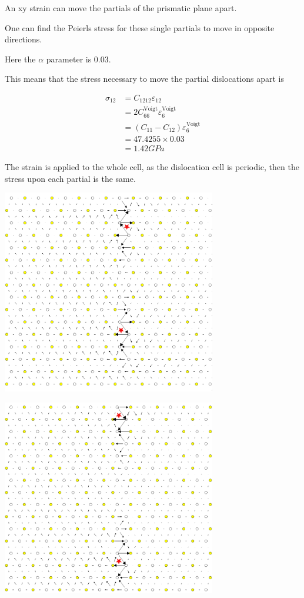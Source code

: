 \documentclass[11pt]{article}
\begin{document}
An xy strain can move the partials of the prismatic plane apart. 

One can find the Peierls stress for these single partials to move
in opposite directions.

Here the \(\alpha\) parameter is 0.03. 

This means that the stress necessary to move the partial
dislocations apart is 

\begin{align*}
\sigma_{12} &= C_{1212}\varepsilon_{12} \\
    &= 2C^{\text{Voigt}}_{66 }\varepsilon_6^{\text{Voigt}} \\
    &= ( C_{11}- C_{12}) \varepsilon_6^{\text{Voigt}} \\
    &= 47.4255 \times 0.03 \\ 
    &= 1.42 GPa\ 
\end{align*}

The strain is applied to the whole cell, as the dislocation cell
is periodic, then the stress upon each partial is the same. 

\begin{center}
\includegraphics[width=0.7\textwidth]{Images/final_model_peierls_xy_0.03_initial_partials.png}
\end{center}
\begin{center}
\includegraphics[width=0.7\textwidth]{Images/final_model_peierls_xy_0.03_final_partials.png}
\end{center}
\end{document}
